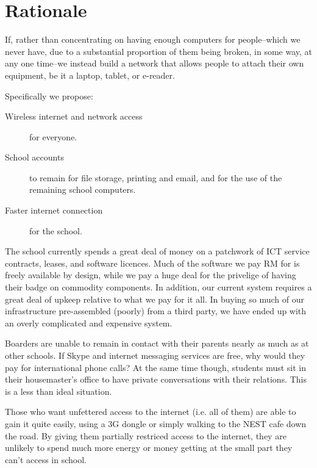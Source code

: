 \documentclass[a4paper,leqno,titlepage]{article}
\begin{document}
\break

\section{Rationale}


If, rather than concentrating on having enough computers for people--which we
never have, due to a substantial proportion of them being broken, in some way,
at any one time--we instead build a network that allows people to attach their
own equipment, be it a laptop, tablet, or e-reader.

Specifically we propose:
    
\begin{description}

\item[Wireless internet and network access] for everyone.
\item[School accounts] to remain for file storage, printing and email, and for
the use of the remaining school computers.
\item[Faster internet connection] for the school.


\end{description}


The school currently spends a great deal of money on a patchwork of ICT
service contracts, leases, and software licences.
Much of the software we pay RM for is freely available by design, while we pay
a huge deal for the privelige of having their badge on commodity components.
In addition, our current system requires a great deal of upkeep relative to
what we pay for it all. In buying so much of our infrastructure pre-assembled
(poorly) from a third party, we have ended up with an overly complicated and
expensive system.


Boarders are unable to remain in contact with their parents nearly as much
as at other schools. If Skype and internet messaging services are free, why
would they pay for international phone calls? At the same time though, students
must sit in their housemaster's office to have private conversations with their
relations. This is a less than ideal situation.

Those who want unfettered access to the internet (i.e. all of them) are
able to gain it quite easily, using a 3G dongle or simply walking to the NEST
cafe down the road. By giving them partially restriced access to the internet,
they are unlikely to spend much more energy or money getting at the small part
they can't access in school.
\end{document}

